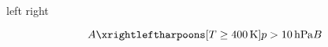 \documentclass{article}
\begin{document}
\begin{center}
left
right
\end{center}
 \[
 A
 \xrightleftharpoons[T \geq 400\,\mathrm{K}]{p > 10\,\mathrm{hPa}}
 B
 \]
\end{document}
